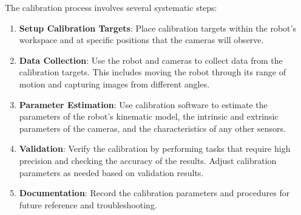 The calibration process involves several systematic steps:

\begin{enumerate}
    \item \textbf{Setup Calibration Targets}: Place calibration targets within the robot's workspace and at specific positions that the cameras will observe.
    \item \textbf{Data Collection}: Use the robot and cameras to collect data from the calibration targets. This includes moving the robot through its range of motion and capturing images from different angles.
    \item \textbf{Parameter Estimation}: Use calibration software to estimate the parameters of the robot’s kinematic model, the intrinsic and extrinsic parameters of the cameras, and the characteristics of any other sensors.
    \item \textbf{Validation}: Verify the calibration by performing tasks that require high precision and checking the accuracy of the results. Adjust calibration parameters as needed based on validation results.
    \item \textbf{Documentation}: Record the calibration parameters and procedures for future reference and troubleshooting.
\end{enumerate}



